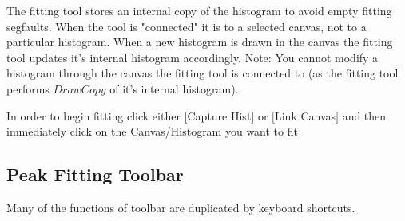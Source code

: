 \documentclass[a4paper,10pt]{article}
\begin{document}
The fitting tool stores an internal copy of the histogram to avoid empty fitting segfaults. When the tool is "connected" it is to a selected canvas, not to a particular histogram. When a new histogram is drawn in the canvas the fitting tool updates it's internal histogram accordingly. Note: You cannot modify a histogram through the canvas the fitting tool is connected to (as the fitting tool performs $DrawCopy$ of it's internal histogram).

In order to begin fitting click either $[$Capture Hist$]$ or $[$Link Canvas$]$ and then immediately click on the Canvas/Histogram you want to fit

\subsection{Peak Fitting Toolbar}
Many of the functions of toolbar are duplicated by keyboard shortcuts.
\end{document}
